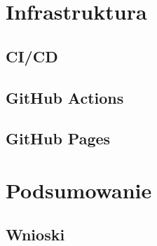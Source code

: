 \documentclass[twoside,a4paper]{report}
\begin{document}
\chapter{Infrastruktura}

\section{CI/CD}

\section{GitHub Actions}

\section{GitHub Pages}


\chapter{Podsumowanie}

\section{Wnioski}


\listoffigures
\lstlistoflistings

\printbibliography

\end{document}
